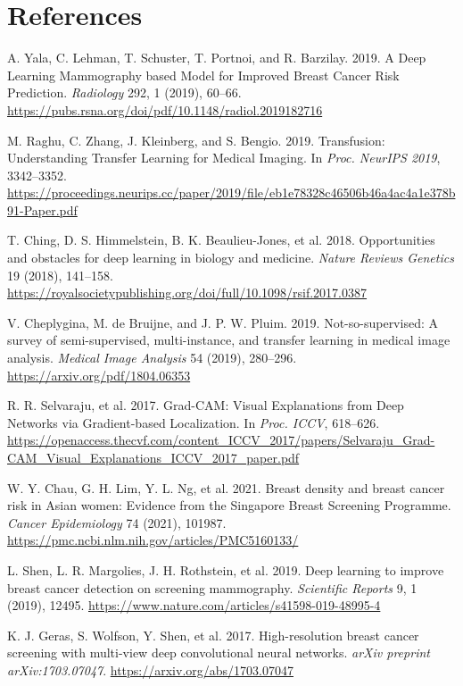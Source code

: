 \documentclass[12pt]{article}
\begin{document}
\section{References}
\begin{thebibliography}{99}

    A. Yala, C. Lehman, T. Schuster, T. Portnoi, and R. Barzilay. 2019. A Deep Learning Mammography based Model for Improved Breast Cancer Risk Prediction. \textit{Radiology} 292, 1 (2019), 60–66. \url{https://pubs.rsna.org/doi/pdf/10.1148/radiol.2019182716}
    
    M. Raghu, C. Zhang, J. Kleinberg, and S. Bengio. 2019. Transfusion: Understanding Transfer Learning for Medical Imaging. In \textit{Proc. NeurIPS 2019}, 3342–3352. \url{https://proceedings.neurips.cc/paper/2019/file/eb1e78328c46506b46a4ac4a1e378b91-Paper.pdf}
    
    T. Ching, D. S. Himmelstein, B. K. Beaulieu-Jones, et al. 2018. Opportunities and obstacles for deep learning in biology and medicine. \textit{Nature Reviews Genetics} 19 (2018), 141–158. \url{https://royalsocietypublishing.org/doi/full/10.1098/rsif.2017.0387}
    
    V. Cheplygina, M. de Bruijne, and J. P. W. Pluim. 2019. Not-so-supervised: A survey of semi-supervised, multi-instance, and transfer learning in medical image analysis. \textit{Medical Image Analysis} 54 (2019), 280–296. \url{https://arxiv.org/pdf/1804.06353}
    
    R. R. Selvaraju, et al. 2017. Grad-CAM: Visual Explanations from Deep Networks via Gradient-based Localization. In \textit{Proc. ICCV}, 618–626. \url{https://openaccess.thecvf.com/content_ICCV_2017/papers/Selvaraju_Grad-CAM_Visual_Explanations_ICCV_2017_paper.pdf}
    
    W. Y. Chau, G. H. Lim, Y. L. Ng, et al. 2021. Breast density and breast cancer risk in Asian women: Evidence from the Singapore Breast Screening Programme. \textit{Cancer Epidemiology} 74 (2021), 101987. \url{https://pmc.ncbi.nlm.nih.gov/articles/PMC5160133/}
    
    L. Shen, L. R. Margolies, J. H. Rothstein, et al. 2019. Deep learning to improve breast cancer detection on screening mammography. \textit{Scientific Reports} 9, 1 (2019), 12495. \url{https://www.nature.com/articles/s41598-019-48995-4}
    
    K. J. Geras, S. Wolfson, Y. Shen, et al. 2017. High-resolution breast cancer screening with multi-view deep convolutional neural networks. \textit{arXiv preprint arXiv:1703.07047}. \url{https://arxiv.org/abs/1703.07047}
    

\end{thebibliography}
\end{document}
